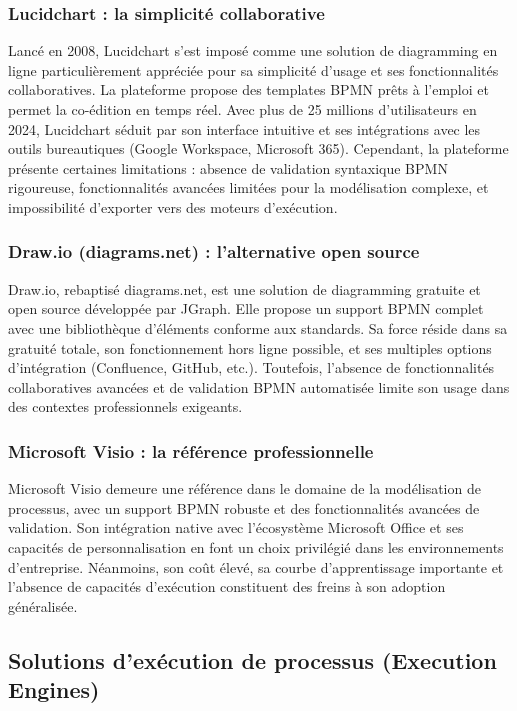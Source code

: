 \subsubsection{Lucidchart : la simplicité collaborative}
Lancé en 2008, Lucidchart s'est imposé comme une solution de diagramming en ligne particulièrement appréciée pour sa simplicité d'usage et ses fonctionnalités collaboratives. La plateforme propose des templates BPMN prêts à l'emploi et permet la co-édition en temps réel. Avec plus de 25 millions d'utilisateurs en 2024, Lucidchart séduit par son interface intuitive et ses intégrations avec les outils bureautiques (Google Workspace, Microsoft 365). Cependant, la plateforme présente certaines limitations : absence de validation syntaxique BPMN rigoureuse, fonctionnalités avancées limitées pour la modélisation complexe, et impossibilité d'exporter vers des moteurs d'exécution.

\subsubsection{Draw.io (diagrams.net) : l'alternative open source}
Draw.io, rebaptisé diagrams.net, est une solution de diagramming gratuite et open source développée par JGraph. Elle propose un support BPMN complet avec une bibliothèque d'éléments conforme aux standards. Sa force réside dans sa gratuité totale, son fonctionnement hors ligne possible, et ses multiples options d'intégration (Confluence, GitHub, etc.). Toutefois, l'absence de fonctionnalités collaboratives avancées et de validation BPMN automatisée limite son usage dans des contextes professionnels exigeants.

\subsubsection{Microsoft Visio : la référence professionnelle}
Microsoft Visio demeure une référence dans le domaine de la modélisation de processus, avec un support BPMN robuste et des fonctionnalités avancées de validation. Son intégration native avec l'écosystème Microsoft Office et ses capacités de personnalisation en font un choix privilégié dans les environnements d'entreprise. Néanmoins, son coût élevé, sa courbe d'apprentissage importante et l'absence de capacités d'exécution constituent des freins à son adoption généralisée.

\subsection{Solutions d'exécution de processus (Execution Engines)}

